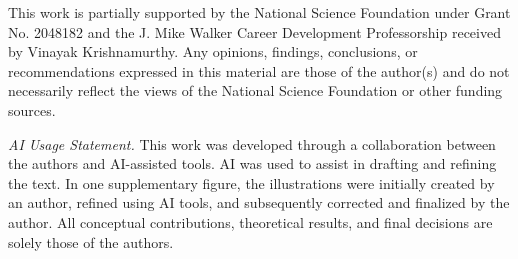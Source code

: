 \documentclass[acmtog]{acmart}
\begin{document}
\begin{acks}
This work is partially supported by the National Science Foundation under Grant No. 2048182 and the J. Mike Walker Career Development Professorship received by Vinayak Krishnamurthy. Any opinions, findings, conclusions, or recommendations expressed in this material are those of the author(s) and do not necessarily reflect the views of the National Science Foundation or other funding sources.

\textit{AI Usage Statement.}
This work was developed through a collaboration between the authors and AI-assisted tools. AI was used to assist in drafting and refining the text. In one supplementary figure, the illustrations were initially created by an author, refined using AI tools, and subsequently corrected and finalized by the author. All conceptual contributions, theoretical results, and final decisions are solely those of the authors.
\end{acks}



\end{document}
